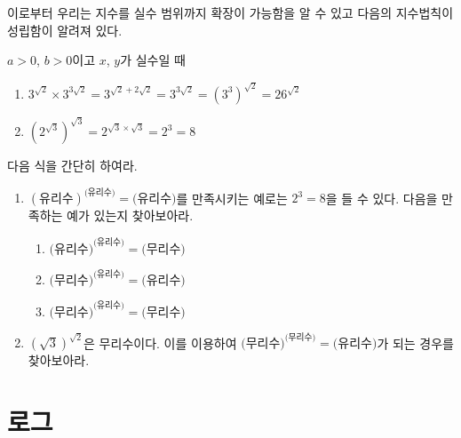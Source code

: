 \documentclass[11pt, a4paper]{book}
\begin{document}
이로부터 우리는 지수를 실수 범위까지 확장이 가능함을 알 수 있고 다음의 지수법칙이 성립함이 알려져 있다.

\begin{theorem}\vspace {-0.5em}
	$a>0$, $b>0$이고 $x$, $y$가 실수일 때
\end{theorem}
\begin{sample}\vspace{-1em}
	\begin{enumerate}[label=(\arabic*)]
		\item $3^{\sqrt{2}}\times 3^{3\sqrt{2}} = 3^{\sqrt{2}+2\sqrt{2}} =3^{3\sqrt{2}}=\left(3^{3}\right)^{\sqrt{2}}= 26^{\sqrt{2}}$
		\item $\left(2^{\sqrt{3}}\right)^{\sqrt{3}} = 2^{\sqrt{3}\times \sqrt{3}} = 2^{3} = 8$
	\end{enumerate}
\end{sample}

\begin{problem}
	다음 식을 간단히 하여라.

\end{problem}

\begin{problem}
	\begin{enumerate}[label=\arabic*]
		\item  $(\text{유리수})^{\text{(유리수)}}=\text{(유리수)}$를 만족시키는 예로는 $2^{3}=8$을 들 수 있다. 다음을 만족하는 예가 있는지 찾아보아라.
		\begin{enumerate}[label=(\arabic*)]
			\item $\text{(유리수)}^{\text{(유리수)}}=\text{(무리수)}$
			\item $\text{(무리수)}^{\text{(유리수)}}=\text{(유리수)}$
			\item $\text{(무리수)}^{\text{(유리수)}}=\text{(무리수)}$
		\end{enumerate}
	\item $(\sqrt{3})^{\sqrt{2}}$은 무리수이다. 이를 이용하여 $\text{(무리수)}^{\text{(무리수)}}=\text{(유리수)}$가 되는 경우를 찾아보아라.
	\end{enumerate}

\end{problem}

	\chapter{\Huge 로그}
\end{document}
